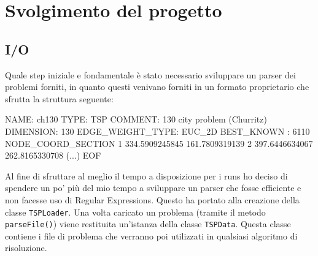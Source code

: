 \documentclass{article}
\newcommand{\ic}[1]{\texttt{#1}}
\begin{document}
\pagebreak
\section{Svolgimento del progetto}
\subsection{I/O}
Quale step iniziale e fondamentale è stato necessario sviluppare un parser dei problemi
forniti, in quanto questi venivano forniti in un formato proprietario che sfrutta la
struttura seguente:

\begin{tsp}
NAME: ch130
TYPE: TSP
COMMENT: 130 city problem (Churritz)
DIMENSION: 130
EDGE_WEIGHT_TYPE: EUC_2D
BEST_KNOWN : 6110
NODE_COORD_SECTION
1 334.5909245845 161.7809319139
2 397.6446634067 262.8165330708
(...)
EOF
\end{tsp}

Al fine di sfruttare al meglio il tempo a disposizione per i runs ho deciso di spendere
un po' più del mio tempo a sviluppare un parser che fosse efficiente e non facesse
uso di Regular Expressions. Questo ha portato alla creazione della classe \ic{TSPLoader}.
Una volta caricato un problema (tramite il metodo \ic{parseFile()}) viene restituita
un'istanza della classe \ic{TSPData}. Questa classe contiene i file di problema che
verranno poi utilizzati in qualsiasi algoritmo di risoluzione.
\end{document}
